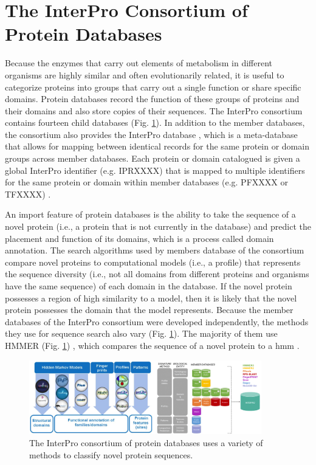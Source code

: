 \section{The InterPro Consortium of Protein Databases} \label{InterProDatabases}

Because the enzymes that carry out elements of metabolism in different organisms are highly similar and often evolutionarily related, it is useful to categorize proteins into groups that carry out a single function or share specific domains. Protein databases record the function of these groups of proteins and their domains and also store copies of their sequences. The InterPro consortium \cite{apweiler2000interpro,hunter2008interpro,Hunter2009} contains fourteen child databases \cite{finn2016interpro,Hunter2009} (Fig. \ref{fig:interpro-databases}). In addition to the member databases, the consortium also provides the InterPro database \cite{hunter2008interpro,finn2016interpro}, which is a meta-database that allows for mapping between identical records for the same protein or domain groups across member databases. Each protein or domain catalogued is given a global InterPro identifier (e.g. IPRXXXX) that is mapped to multiple identifiers for the same protein or domain within member databases (e.g. PFXXXX or TFXXXX) \cite{hunter2008interpro,finn2016interpro}.

An import feature of protein databases is the ability to take the sequence of a novel protein (i.e., a protein that is not currently in the database) and predict the placement and function of its domains, which is a process called domain annotation. The search algorithms used by members database of the consortium compare novel proteins to computational models (i.e., a profile) that represents the sequence diversity (i.e., not all domains from different proteins and organisms have the same sequence) of each domain in the database. If the novel protein possesses a region of high similarity to a model, then it is likely that the novel protein possesses the domain that the model represents. Because the member databases of the InterPro consortium were developed independently, the methods they use for sequence search also vary (Fig. \ref{fig:interpro-databases}). The majority of them use HMMER (Fig. \ref{fig:interpro-databases}) \cite{eddy2011accelerated}, which compares the sequence of a novel protein to a \gls{hmm} \cite{de2007hidden}.

\begin{figure}[!ht]
  \centering
	\includegraphics[width=0.90\textwidth]{media/InterPro.png}
	 \caption{The InterPro consortium of protein databases uses a variety of methods to classify novel protein sequences.}
	 \label{fig:interpro-databases}
\end{figure}

